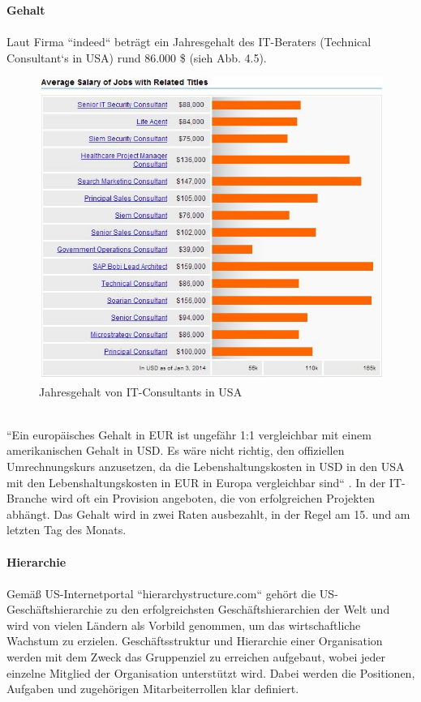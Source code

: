 	\textbf{Gehalt}\\
		\\
		Laut Firma ``indeed`` beträgt ein Jahresgehalt des IT-Beraters (Technical Consultant`s in USA) rund 86.000 \$ (sieh Abb. 4.5).
		\begin{figure}[ht]
				\centering
				\includegraphics[width=0.7\linewidth]{./images/Techn_Cons_Sal}
				\caption{Jahresgehalt von IT-Consultants in USA}
				\label{fig:TechConsSal}
				\end{figure}\\
		``Ein europäisches Gehalt in EUR ist ungefähr 1:1 vergleichbar mit einem 
		amerikanischen Gehalt in USD. Es wäre nicht richtig, den offiziellen Umrechnungskurs anzusetzen, da die Lebenshaltungskosten in USD in den USA mit den Lebenshaltungskosten in EUR in Europa vergleichbar sind`` \cite{InfoUSArbVertr}. In der IT-Branche wird oft ein Provision angeboten, die von erfolgreichen 
		Projekten abhängt. Das Gehalt wird in zwei Raten ausbezahlt, in der Regel am 15. und am letzten Tag des Monats.\\ \\
	\textbf{Hierarchie} \\ \\
	Gemäß US-Internetportal ``hierarchystructure.com`` \cite{HierarchieUSA} gehört die US- Geschäftshierarchie zu den erfolgreichsten Geschäftshierarchien der Welt und wird von vielen Ländern als Vorbild genommen, um das wirtschaftliche Wachstum zu erzielen. Geschäftsstruktur und Hierarchie einer Organisation werden mit dem Zweck das Gruppenziel zu erreichen aufgebaut, wobei jeder einzelne Mitglied der Organisation unterstützt wird. Dabei werden die Positionen, Aufgaben und zugehörigen Mitarbeiterrollen klar definiert.
